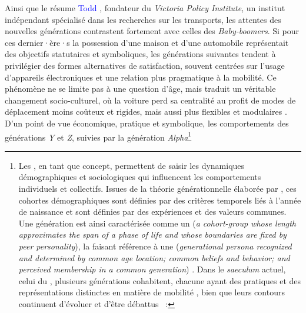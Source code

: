 \begin{refsegment}
Ainsi que le résume \textcolor{blue}{Todd} \textcolor{blue}{\textcite[29]{litman_current_2012}}, fondateur du \textsl{Victoria Policy Institute}, un institut indépendant spécialisé dans les recherches sur les transports, les attentes des nouvelles générations contrastent fortement avec celles des \textsl{Baby-boomers}. Si pour ces dernier·ère·s la possession d'une maison et d'une automobile représentait des objectifs statutaires et symboliques, les générations suivantes tendent à privilégier des formes alternatives de satisfaction, souvent centrées sur l'usage d'appareils électroniques et une relation plus pragmatique à la mobilité. Ce phénomène ne se limite pas à une question d'âge, mais traduit un véritable changement socio-culturel, où la voiture perd sa centralité au profit de modes de déplacement moins coûteux et rigides, mais aussi plus flexibles et modulaires \textcolor{blue}{\autocite{peaslee_one_2021}}. D'un point de vue économique, pratique et symbolique, les comportements des générations \textsl{Y} et \textsl{Z}, suivies par la génération \textsl{Alpha}\footnote{
    Les , en tant que concept, permettent de saisir les dynamiques démographiques et sociologiques qui influencent les comportements individuels et collectifs. Issues de la théorie générationnelle élaborée par \textcolor{blue}{\textcite{strauss_generations_1992}}, ces cohortes démographiques sont définies par des critères temporels liés à l'année de naissance et sont définies par des expériences et des valeurs communes. Une génération est ainsi caractérisée comme un  (\textsl{a cohort-group whose length approximates the span of a phase of life and whose boundaries are fixed by peer personality}), la  faisant référence à une  (\textsl{generational persona recognized and determined by common age location; common beliefs and behavior; and perceived membership in a common generation}) \textcolor{blue}{\autocite[60, 64]{strauss_generations_1992}}. Dans le \textsl{saeculum} actuel, celui du , plusieurs générations cohabitent, chacune ayant des pratiques et des représentations distinctes en matière de mobilité \textcolor{blue}{\autocite[31-57]{howe_millennials_2000}}, bien que leurs contours continuent d'évoluer et d'être débattus \textcolor{blue}{\autocite[3]{wang_bike_2018}}~:
}
\end{refsegment}

